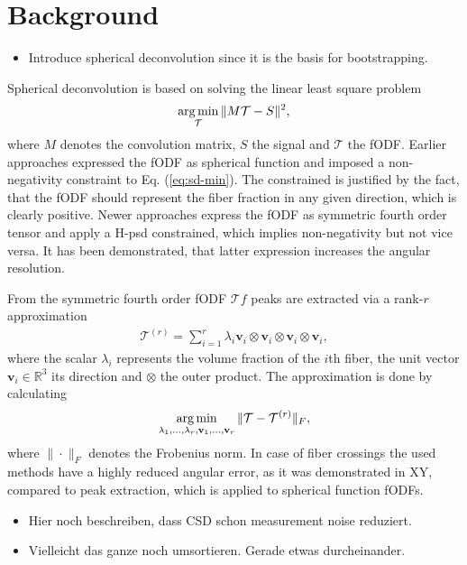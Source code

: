 \section{Background}
\begin{itemize}
	\item Introduce spherical deconvolution since it is the basis for
		bootstrapping. 

\end{itemize}
Spherical deconvolution is based on solving the linear least square problem 
\begin{align}
	\operatorname*{arg\,min}_{\mathcal{T}} \| M \mathcal{T} - S \|^2,
	\label{eq:sd-min}
\end{align}
where 
$M$ denotes the convolution matrix, $S$ the signal and $\mathcal{T}$ the fODF.
Earlier approaches expressed the fODF as spherical function and imposed a
non-negativity constraint to Eq. (\ref{eq:sd-min}). The constrained is justified by
the fact, that the fODF should represent the fiber fraction in any given
direction, which is clearly positive. 
Newer approaches express the fODF as symmetric fourth order tensor and apply a
H-psd constrained, which implies non-negativity but not vice versa. It has been
demonstrated, that latter expression increases the angular resolution. 

From the symmetric fourth order fODF $\mathcal{T}f$ peaks are extracted via a rank-$r$
approximation 
\begin{align}
	\mathcal{T}^{\left( r \right)} = \sum_{i=1}^r \lambda_i \mathbf{v}_i
	\otimes \mathbf{v}_i \otimes \mathbf{v}_i \otimes \mathbf{v}_i, 
	\label{eq:low-rank}
\end{align}
where the scalar $\lambda_i$ represents the volume fraction of the $i$th fiber,
the unit vector $\mathbf{v}_i \in \mathbb{R}^3$ its direction and $\otimes$ the
outer product. The approximation is done by calculating 
\[ \operatorname*{arg\,min}_{\lambda_1, \dots , \lambda_r , \mathbf{v}_1, \dots , \mathbf{v}_r}
\| \mathcal{T} - \mathcal{T}^{\left( r \right)} \|_F, \]
where $\| \cdot \|_F$ denotes the Frobenius norm. In case of fiber crossings the
used methods have a highly reduced angular error, as it was demonstrated in XY,
compared to peak extraction, which is applied to spherical function fODFs. 

\begin{itemize}
	\item Hier noch beschreiben, dass CSD schon measurement noise reduziert. 
	\item Vielleicht das ganze noch umsortieren. Gerade etwas durcheinander. 
\end{itemize}
